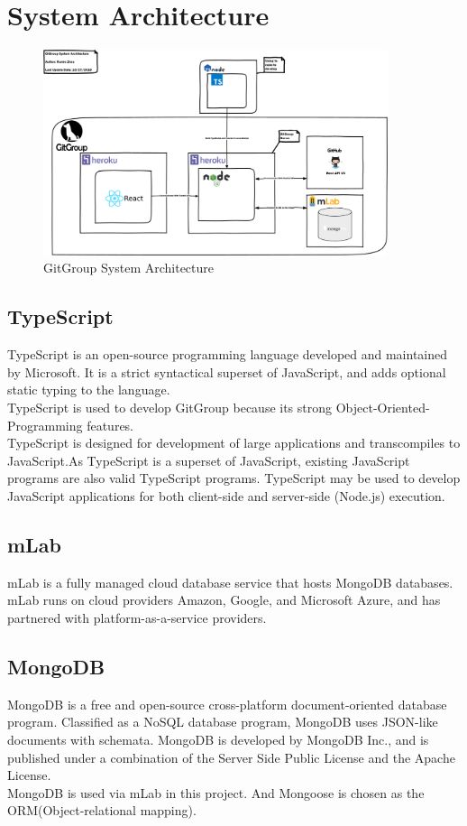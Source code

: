 \documentclass[12pt,a4paper]{report}
\begin{document}
\chapter{System Architecture}
\begin{figure}[H]
	\centering
	\includegraphics[width=0.9\textwidth]{./pics/SystemArchitecture.png}
	\caption{GitGroup System Architecture}
\end{figure}
\section{TypeScript}
TypeScript \cite{wiki:typescript} is an open-source programming language developed and maintained by Microsoft. It is a strict syntactical superset of JavaScript, and adds optional static typing to the language. \\
TypeScript is used to develop GitGroup because its strong Object-Oriented-Programming features.\\
TypeScript is designed for development of large applications and transcompiles to JavaScript.As TypeScript is a superset of JavaScript, existing JavaScript programs are also valid TypeScript programs. TypeScript may be used to develop JavaScript applications for both client-side and server-side (Node.js) execution.\\
\section{mLab}
mLab \cite{wiki:mlab} is a fully managed cloud database service that hosts MongoDB databases. mLab runs on cloud providers Amazon, Google, and Microsoft Azure, and has partnered with platform-as-a-service providers. 
\section{MongoDB}
MongoDB \cite{wiki:mongodb} is a free and open-source cross-platform document-oriented database program. Classified as a NoSQL database program, MongoDB uses JSON-like documents with schemata. MongoDB is developed by MongoDB Inc., and is published under a combination of the Server Side Public License and the Apache License. 
\\
MongoDB is used via mLab in this project. And Mongoose is chosen as the ORM(Object-relational mapping).
\end{document}
